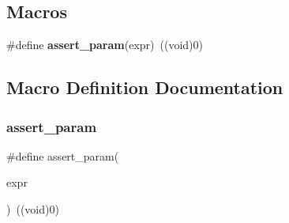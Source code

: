 \subsection*{Macros}
\begin{DoxyCompactItemize}
\item 
\#define \textbf{ assert\+\_\+param}(expr)~((void)0)
\end{DoxyCompactItemize}


\subsection{Macro Definition Documentation}
\mbox{\label{stm32f10x__conf_8h_a631dea7b230e600555f979c62af1de21}} 
\subsubsection{assert\+\_\+param}
{\footnotesize\ttfamily \#define assert\+\_\+param(\begin{DoxyParamCaption}\item[{}]{expr }\end{DoxyParamCaption})~((void)0)}

